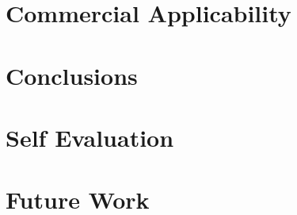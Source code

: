 \section{Commercial Applicability}

\section{Conclusions}

\section{Self Evaluation}

\section{Future Work}